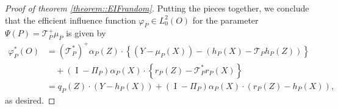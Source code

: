 \documentclass[11pt]{article}
\theoremstyle{plain}
\theoremstyle{definition}
\theoremstyle{remark}
\theoremstyle{definition}
\begin{document}
\begin{proof}[Proof of theorem \ref{theorem::EIFrandom}]
 


Putting the pieces together, we conclude that the efficient influence function \( \varphi_P \in L_0^2(O) \) for the parameter \( \Psi(P) = \mathcal{T}_P^+ \mu_P \) is given by
\begin{align*}
 \varphi_P^*(O) 
    &= (\mathcal{T}_P^*)^+ \alpha_P(Z) \cdot \left\{ (Y - \mu_P(X)) - \left(h_P(X) - \mathcal{T}_P h_P(Z)\right) \right\} \\
    &\quad + (\operatorname{I} - \Pi_P)\alpha_P(X) \cdot \left\{ r_P(Z) - \mathcal{T}_P^* r_P(X) \right\} \\
    &= q_P(Z) \cdot \left( Y - h_P(X) \right) + (\operatorname{I} - \Pi_P) \alpha_P(X) \cdot \left( r_P(Z) - h_P(X) \right),
\end{align*}
as desired.

 


\end{proof}
 
\end{document}
